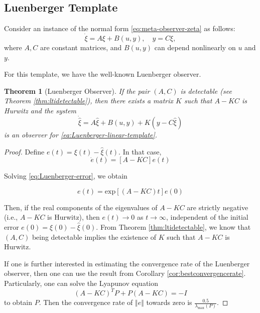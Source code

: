 \documentclass[
]{book}
\newtheorem{theorem}{Theorem}[chapter]
\theoremstyle{definition}
\theoremstyle{definition}
\theoremstyle{definition}
\theoremstyle{definition}
\theoremstyle{remark}
\begin{document}
\hypertarget{luenberger-template}{%
\subsection{Luenberger Template}\label{luenberger-template}}

Consider an instance of the normal form \eqref{eq:meta-observer-zeta} as follows:
\begin{equation}
\dot{\xi} = A \xi + B(u,y), \quad y = C \xi,
\label{eq:Luenberger-linear-template}
\end{equation}
where \(A,C\) are constant matrices, and \(B(u,y)\) can depend nonlinearly on \(u\) and \(y\).

For this template, we have the well-known Luenberger observer.

\begin{theorem}[Luenberger Observer]
\protect\hypertarget{thm:LuenbergerLinear}{}\label{thm:LuenbergerLinear}If the pair \((A,C)\) is detectable (see Theorem \ref{thm:ltidetectable}), then there exists a matrix \(K\) such that \(A-KC\) is Hurwitz and the system
\begin{equation}
\dot{\hat{\xi}} = A \hat{\xi} + B(u,y) + K(y - C \hat{\xi})
\label{eq:Luenberger-Linear}
\end{equation}
is an observer for \eqref{eq:Luenberger-linear-template}.
\end{theorem}

\begin{proof}
Define \(e(t) = \xi(t) - \hat{\xi}(t)\). In that case,
\begin{equation}
    \dot{e}(t) = [A - KC] e(t)
    \label{eq:Luenberger-error}
\end{equation}

Solving \eqref{eq:Luenberger-error}, we obtain

\begin{equation}
    e(t) = \mathrm{exp}[(A - KC)t] e(0)
\end{equation}

Then, if the real components of the eigenvalues of \(A - KC\) are strictly negative (i.e., \(A - KC\) is Hurwitz), then \(e(t) \rightarrow 0\) as \(t \rightarrow \infty\), independent of the initial error \(e(0) = \xi(0) - \hat{\xi}(0)\). From Theorem \ref{thm:ltidetectable}, we know that \((A,C)\) being detectable implies the existence of \(K\) such that \(A - KC\) is Hurwitz.

If one is further interested in estimating the convergence rate of the Luenberger observer, then one can use the result from Corollary \ref{cor:bestconvergencerate}. Particularly, one can solve the Lyapunov equation
\[
(A - KC)^T P + P (A - KC) = - I
\]
to obtain \(P\). Then the convergence rate of \(\Vert e \Vert\) towards zero is \(\frac{0.5}{\lambda_{\max}(P)}\).
\end{proof}
\end{document}
